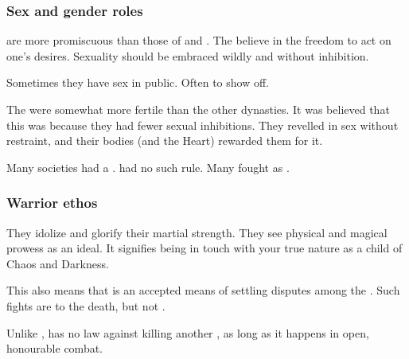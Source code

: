 \subsubsection{Sex and gender roles}
\Mystraacht{} \resviel{} are more promiscuous than those of \CiriathSepher{} and \TiphredSerah. 
The \Mystraacht{} believe in the freedom to act on one's desires. 
Sexuality should be embraced wildly and without inhibition. 

Sometimes they have sex in public. 
Often to show off. 

The \Mystraacht were somewhat more fertile than the other dynasties.
It was believed that this was because they had fewer sexual inhibitions.
They revelled in sex without restraint, and their bodies (and the Heart) rewarded them for it.

Many \resphan{} societies had a . 
\Mystraacht{} had no such rule. 
Many \Mystraacht{} \resviel{} fought as . 





\subsubsection{Warrior ethos}
They idolize and glorify their martial strength. 
They see physical and magical prowess as an ideal. 
It signifies being in touch with your true nature as a child of Chaos and Darkness. 

This also means that  is an accepted means of settling disputes among the \Mystraacht. 
Such fights are to the death, but not . 

Unlike \KiriathSepher, \Mystraacht{} has no law against killing another \resphan, as long as it happens in open, honourable combat. 


